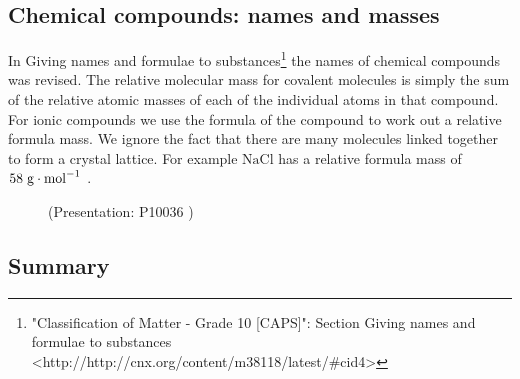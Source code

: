             \subsection{ Chemical compounds: names and masses}
            \nopagebreak
            

\label{m38689*uid97124}In Giving names and formulae to substances\footnote{\raggedright{}"Classification of Matter - Grade 10 [CAPS]": Section Giving names and formulae to substances <http://http://cnx.org/content/m38118/latest/\#cid4>} the names of chemical compounds was revised. The relative molecular mass for covalent molecules is simply the sum of the relative atomic masses of each of the individual atoms in that compound. For ionic compounds we use the formula of the compound to work out a relative formula mass. We ignore the fact that there are many molecules linked together to form a crystal lattice. For example \begin{math}\mathrm{NaCl}\end{math} has a relative formula mass of \begin{math}58\phantom{\rule{3pt}{0ex}}\mathrm{g}\ensuremath{\cdot}{\mathrm{mol}}^{-1}\end{math} .  
 

    \label{m38689*eip-891}
    \setcounter{subfigure}{0}


	\begin{figure}[H] %
    
    \label{m38689*slidesharemedia}\label{m38689*slideshareflash} { (Presentation:  P10036 )}
      
      \vspace{2pt}
    \vspace{.1in}
    
    

 \end{figure}   

    \addtocounter{footnote}{-0}
    \par \label{m38689*cid13}
            \subsection{ Summary}
            \nopagebreak
            
